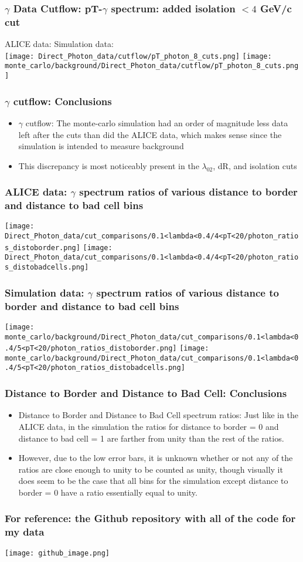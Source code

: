 \documentclass{beamer}
\begin{document}
\frame
{
	\frametitle{$\gamma$ Data Cutflow: pT-$\gamma$ spectrum: added isolation $< 4$ GeV/c cut}
	\noindent\hspace{1.5 cm}ALICE data: 
	\noindent\hspace{3.0 cm} Simulation data:\\
	\texttt{[image: Direct\_Photon\_data/cutflow/pT\_photon\_8\_cuts.png]}
	\texttt{[image: monte\_carlo/background/Direct\_Photon\_data/cutflow/pT\_photon\_8\_cuts.png]}
}

\frame
{
	\frametitle{$\gamma$ cutflow: Conclusions}
	\begin{itemize}
	\item $\gamma$ cutflow: The monte-carlo simulation had an order of magnitude less data left after the cuts than did the ALICE data, which makes sense since the simulation is intended to measure background
	\item This discrepancy is most noticeably present in the $\lambda_{02}$, dR, and isolation cuts
	\end{itemize}
}


\frame
{
	\frametitle{ALICE data: $\gamma$ spectrum ratios of various distance to border and distance to bad cell bins}
	\texttt{[image: Direct\_Photon\_data/cut\_comparisons/0.1<lambda<0.4/4<pT<20/photon\_ratios\_distoborder.png]}
	\texttt{[image: Direct\_Photon\_data/cut\_comparisons/0.1<lambda<0.4/4<pT<20/photon\_ratios\_distobadcells.png]}
}

\frame
{
	\frametitle{Simulation data: $\gamma$ spectrum ratios of various distance to border and distance to bad cell bins}
	\texttt{[image: monte\_carlo/background/Direct\_Photon\_data/cut\_comparisons/0.1<lambda<0.4/5<pT<20/photon\_ratios\_distoborder.png]}
	\texttt{[image: monte\_carlo/background/Direct\_Photon\_data/cut\_comparisons/0.1<lambda<0.4/5<pT<20/photon\_ratios\_distobadcells.png]}
}

\frame
{
	\frametitle{Distance to Border and Distance to Bad Cell: Conclusions}
	\begin{itemize}
	\item Distance to Border and Distance to Bad Cell spectrum ratios: Just like in the ALICE data, in the simulation the ratios for distance to border = 0 and distance to bad cell = 1 are farther from unity than the rest of the ratios. 
	\item However, due to the low error bars, it is unknown whether or not any of the ratios are close enough to unity to be counted as unity, though visually it does seem to be the case that all bins for the simulation except distance to border = 0 have a ratio essentially equal to unity.
	\end{itemize}
}

\frame 
{
	\frametitle{For reference: the Github repository with all of the code for my data}
	\texttt{[image: github\_image.png]}
}
\end{document}
